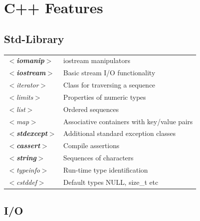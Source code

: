 \section{C++ Features}

\subsection{Std-Library}
\begin{tabular}{ll}
\textit{$<$\textbf{iomanip}$>$} & iostream manipulators \\
\textit{$<$\textbf{iostream}$>$} & Basic stream I/O functionality \\
\textit{$<$iterator$>$} & Class for traversing a sequence \\
\textit{$<$limits$>$} & Properties of numeric types \\
\textit{$<$list$>$} & Ordered sequences \\
\textit{$<$map$>$} & Associative containers with key/value pairs \\
\textit{$<$\textbf{stdexcept}$>$} & Additional standard exception classes \\
\textit{$<$\textbf{cassert}$>$} & Compile assertions \\
\textit{$<$\textbf{string}$>$} & Sequences of characters \\
\textit{$<$typeinfo$>$} & Run-time type identification \\
\textit{$<$cstddef$>$} & Default types NULL, size\_t etc  \\
\end{tabular}


\subsection{I/O}


